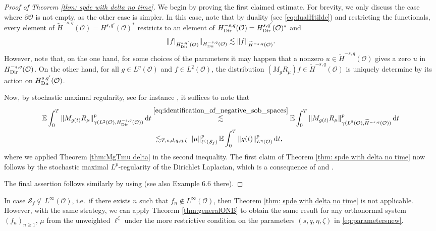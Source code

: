 \documentclass[reqno]{amsart}
\theoremstyle{plain}
\theoremstyle{remark}
\theoremstyle{plain}
\numberwithin{equation}{section}
\newcommand\cO{\mathcal{O}}
\newcommand{\E}{{\mathbb E}}
\newcommand{\wt}{\widetilde}
\newcommand{\di}{\mathrm{d}}
\newcommand{\1}{\one}
\newcommand{\Sf}{\mathcal{S}_{f}}
\begin{document}
\begin{proof}[Proof of Theorem \ref{thm: spde with delta no time}]
We begin by proving the first claimed estimate.
For brevity, we only discuss the case  where $\partial\cO$ is not empty, as the other case is simpler. 
In this case, note that by duality (see \eqref{eq:dualHtilde}) and restricting the functionals, every element of $\wt{H}^{-s,q}(\cO)= H^{s,q'}(\cO)^*$ restricts to an element of $H_{\rm Dir}^{-s,q}(\cO) = H_{\rm Dir}^{s,q'}(\cO)^*$ and 
\begin{equation}
\label{eq:identification_of_negative_sob_spaces}
\|f|_{H^{s,q'}_{{\rm Dir}}(\cO)}\|_{H_{\rm Dir}^{-s,q}(\cO)} \lesssim \|f\|_{\wt{H}^{-s,q}(\cO)}.
\end{equation}
However, note that, on the one hand, for some choices of the parameters it may happen that 
a nonzero $u\in \wt{H}^{-s,q}(\cO)$ gives a zero $u$ in $H_{\rm Dir}^{-s,q}(\cO)$. On the other hand, for all $g\in L^\eta(\cO)$ and $f\in L^2(\cO)$, the distribution $(M_{g} R_\mu) f\in \wt{H}^{-s,q}(\cO)$ is uniquely determine by its action on $H_{\rm Dir}^{s,q'}(\cO)$.


Now, by stochastic maximal regularity, see for instance \cite[Section 3]{AV25_survey}, it suffices to note that
    \begin{align*}
    \E\int_0^T \|M_{g(t)}R_\mu\|_{\gamma(L^2(\cO),H^{-s,q}_{\rm Dir}(\cO))}^p \,\di t
        &\stackrel{\eqref{eq:identification_of_negative_sob_spaces}}{\lesssim} \E\int_0^T \|M_{g(t)}R_\mu\|_{\gamma(L^2(\cO),\wt{H}^{-s,q}(\cO))}^p \,\di t\\
        & \ \lesssim_{T,s,d,q,\eta,\zeta} \|\mu\|_{\ell^\zeta(\Sf)}^p\,
        \E\int_0^T 
        \|g(t)\|_{L^\eta(\cO)}^p \,\di t,
    \end{align*}
    where we applied Theorem \ref{thm:MgTmu delta} in the second inequality.
    The first claim of Theorem \ref{thm: spde with delta no time} now follows by  the stochastic maximal $L^p$-regularity of the Dirichlet Laplacian, which is a consequence of \cite[Theorems 1.1 and 1.2]{MaximalLpregularity} and \cite[Example A.3 and Proposition A.1(3)]{AV25_survey}. 

The final assertion follows similarly by using \cite[Theorem 6.5]{ALV21} (see also Example 6.6 there).
\end{proof}


In case $\Sf\not\subseteq L^\infty(\cO)$, i.e.\ if there exists $n$ such that $f_n\notin L^\infty(\cO)$, then Theorem \ref{thm: spde with delta no time} is not applicable. However, with the same strategy, we can apply Theorem \ref{thm:generalONB} to obtain the same result for any orthonormal system $(f_n)_{n\geq 1}$, $\mu$ from the unweighted $\ell^{\zeta}$ under the more restrictive condition on the parameters $(s,q,\eta, \zeta)$ in \eqref{eq:parametersnew}.
\end{document}
